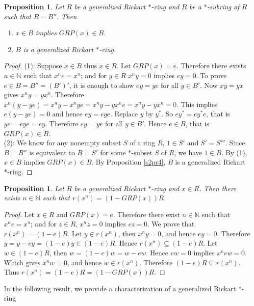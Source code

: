 \documentclass[11pt, one side,emlines]{amsart}
\newtheorem{proposition}[lemma]{Proposition}
\theoremstyle{definition}
\numberwithin{equation}{section} \thispagestyle{empty} \voffset
\begin{document}
\begin{proposition} \label{s2pr5} Let $R$ be a generalized  Rickart $*$-ring and 
	$B$ be a $*$-subring of $R$ such that $ B=B''$. Then 
	\begin{enumerate}
		\item  $x\in B$ implies $GRP(x)\in B$.
		\item  $B$ is a generalized  Rickart $*$-ring.
	\end{enumerate}
\end{proposition}
\begin{proof} (1): Suppose $x\in B$ thus $x\in R$. Let $ GRP(x)=e$. Therefore there exists $n \in \mathbb N$ such that $x^ne=x^n$; and for $y\in R$ $x^ny=0$ implies $ey=0$. To prove $e\in B=B''=(B')'$, it is enough to show $ey=ye$ for all $y\in B'$.
	Now $xy=yx $  gives $x^ny=yx^n$. Therefore $x^n(y-ye)=x^ny-x^nye=x^ny-yx^ne=x^ny-yx^n=0$.
	This implies $e(y-ye)=0$ and hence $ey=eye$. Replace $y$ by $ y^*$. So $ey^*=ey^*e$, that is $ye=eye=ey$.
	Therefore $ey=ye$ for all $y\in B'$. Hence  $e\in B$, that is $GRP(x)\in B$.\\
    (2): We know for any nonempty subset $S$ of a ring $R$, $1\in S'$ and $ S'= S'''$.
    Since $B=B''$ is equivalent to $B=S'$ for some $*$-subset $S$ of $R$, we have $1\in B$.	
	By (1), $x\in B$ implies $GRP(x)\in B $. By Proposition \ref{s2pr4}, $B$ is a generalized  Rickart $ *$-ring.
\end{proof}

\begin{proposition} \label{s2pr6} Let $R$ be a generalized  Rickart $ *$-ring and $x\in R$. Then there exists $n\in\mathbb N$ such that $r(x^n)=(1-GRP(x))R$.
\end{proposition}
\begin{proof}  Let $x\in R$ and $GRP(x)=e$. Therefore there exist $n \in \mathbb N$ such that 
	$x^ne=x^n$; and for $z \in R$, $x^nz=0$ implies $ez=0$.
	We prove that $r(x^n)=(1-e)R$. Let $y\in r(x^n)$, then $x^ny=0$, and hence $ey=0$. 
	Therefore $y=y-ey=(1-e)y\in(1-e)R$. Hence $r(x^n)\subseteq  (1-e) R$. 
	Let $w\in(1-e)R$, then $w=(1-e)w=w-ew$. Hence $ew=0$ implies $x^new=0$. Which gives $x^nw=0$, and hence  $w\in r(x^n)$. Therefore $(1-e)R\subseteq r(x^n)$. Thus $r(x^n)=(1-e)R=(1-GRP(x))R$.
\end{proof}

In the following result, we provide a characterization of a generalized Rickart $*$-ring 
\end{document}
